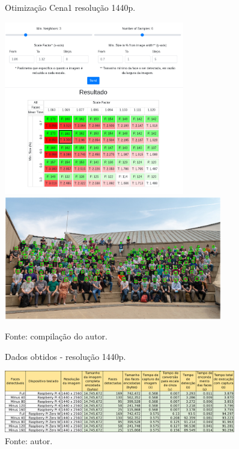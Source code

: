 \begin{figure}[H]
    \centering
    \caption[Otimização Cena 1 - resolução 1440p.]{Otimização Cena1 resolução 1440p.}
    \includegraphics[width=0.70\textwidth]{Cap4_Experimentos_Realizados/Figures/cena1_param_1440p_matriz.jpg}
    \includegraphics[width=0.85\textwidth]{Cap4_Experimentos_Realizados/Figures/cena1_param_1440p_faces.jpg}
    \caption*{Fonte: compilação do autor.\footnotemark}
    \label{fig:otimizacaoCena1_1440p}
\end{figure}

    
\begin{figure}[H]
    \centering
    \caption[Dados obtidos - resolução 1440p.]{Dados obtidos - resolução 1440p.}
    \includegraphics[width=0.90\textwidth]{Cap4_Experimentos_Realizados/Figures/cena1_dados_1440p_br.jpg}
    \caption*{Fonte: autor.}
    \label{fig:dadosCena1_1440p}
\end{figure}

